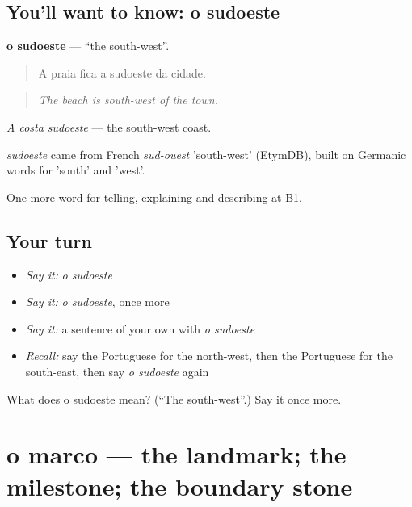 \subsection*{You'll want to know: o sudoeste}
\textbf{o sudoeste} — \textquotedblleft{}the south-west\textquotedblright{}.

\begin{quote}
A praia fica a sudoeste da cidade.
\end{quote}

\begin{quote}
\emph{The beach is south-west of the town.}
\end{quote}

\emph{A costa sudoeste} — the south-west coast.

\begin{cousinweb}
\emph{sudoeste} came from French \emph{sud-ouest} 'south-west' (EtymDB), built on Germanic words for 'south' and 'west'.
\end{cousinweb}

\begin{grammarlens}[title={What you've built}]
One more word for telling, explaining and describing at B1.
\end{grammarlens}

\subsection*{Your turn}
\begin{itemize}
\raggedright
  \item \emph{Say it:} \emph{o sudoeste}
  \item \emph{Say it:} \emph{o sudoeste}, once more
  \item \emph{Say it:} a sentence of your own with \emph{o sudoeste}
  \item \emph{Recall:} say the Portuguese for the north-west, then the Portuguese for the south-east, then say \emph{o sudoeste} again
\end{itemize}

\begin{tcolorbox}[breakable,colback=teal!4,colframe=teal!35!black,title={Before you move on}]
What does o sudoeste mean? (\textquotedblleft{}The south-west\textquotedblright{}.) Say it once more.
\end{tcolorbox}
\section[o marco]{o marco — the landmark; the milestone; the boundary stone}

